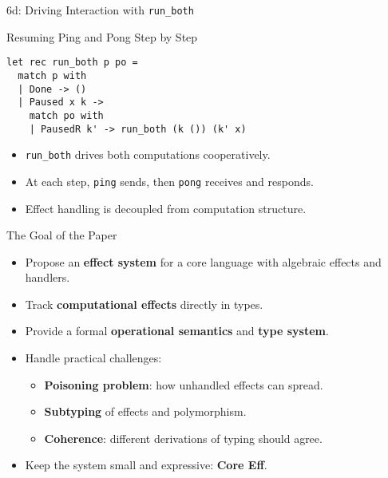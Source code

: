 \begin{frame}[fragile]{6d: Driving Interaction with \texttt{run\_both}}
\vspace{-0.5em}
\begin{block}{\scriptsize Resuming Ping and Pong Step by Step}
\begin{scriptsize}
\begin{verbatim}
let rec run_both p po =
  match p with
  | Done -> ()
  | Paused x k ->
    match po with
    | PausedR k' -> run_both (k ()) (k' x)
\end{verbatim}
\end{scriptsize}
\end{block}

\begin{itemize}
  \item \texttt{run\_both} drives both computations cooperatively.
  \item At each step, \texttt{ping} sends, then \texttt{pong} receives and responds.
  \item Effect handling is decoupled from computation structure.
\end{itemize}
\end{frame}

\begin{frame}{The Goal of the Paper}
\begin{itemize}
  \item Propose an \textbf{effect system} for a core language with algebraic effects and handlers.
  \item Track \textbf{computational effects} directly in types.
  \item Provide a formal \textbf{operational semantics} and \textbf{type system}.
  \item Handle practical challenges:
  \begin{itemize}
    \item \textbf{Poisoning problem}: how unhandled effects can spread.
    \item \textbf{Subtyping} of effects and polymorphism.
    \item \textbf{Coherence}: different derivations of typing should agree.
  \end{itemize}
  \item Keep the system small and expressive: \textbf{Core Eff}.
\end{itemize}
\end{frame}